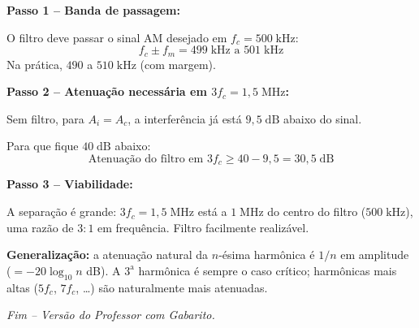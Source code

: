 \documentclass[11pt,a4paper]{article}
\begin{document}
\begin{resolucao}

\textbf{Passo 1 -- Banda de passagem:}

O filtro deve passar o sinal AM desejado em $f_c = 500\;\text{kHz}$:
\[
  \boxed{f_c \pm f_m = 499\;\text{kHz a } 501\;\text{kHz}}
\]
Na prática, $490$ a $510\;\text{kHz}$ (com margem).

\textbf{Passo 2 -- Atenuação necessária em $3f_c = 1{,}5\;\text{MHz}$:}

Sem filtro, para $A_i = A_c$, a interferência já está $9{,}5\;\text{dB}$ abaixo do sinal.

Para que fique $40\;\text{dB}$ abaixo:
\[
  \text{Atenuação do filtro em } 3f_c \geq 40 - 9{,}5 = \boxed{30{,}5\;\text{dB}}
\]

\textbf{Passo 3 -- Viabilidade:}

A separação é grande: $3f_c = 1{,}5\;\text{MHz}$ está a $1\;\text{MHz}$ do centro do filtro ($500\;\text{kHz}$), uma razão de $3{:}1$ em frequência. Filtro facilmente realizável.

\textbf{Generalização:} a atenuação natural da $n$-ésima harmônica é $1/n$ em amplitude ($= -20\log_{10} n$ dB). A $3^{\text{a}}$ harmônica é sempre o caso crítico; harmônicas mais altas ($5f_c$, $7f_c$, \ldots) são naturalmente mais atenuadas.
\end{resolucao}

\vfill
\begin{center}
  \small\textit{Fim -- Versão do Professor com Gabarito.}
\end{center}
\end{document}
